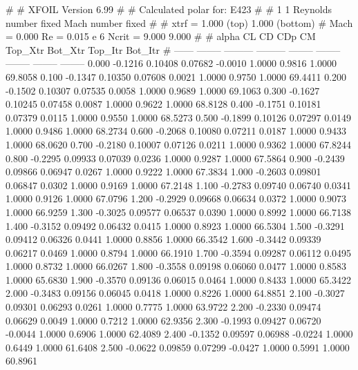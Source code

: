 #  
#       XFOIL         Version 6.99
#  
# Calculated polar for: E423                                            
#  
# 1 1 Reynolds number fixed          Mach number fixed         
#  
# xtrf =   1.000 (top)        1.000 (bottom)  
# Mach =   0.000     Re =     0.015 e 6     Ncrit =   9.000  9.000
#  
#   alpha    CL        CD       CDp       CM     Top_Xtr  Bot_Xtr  Top_Itr  Bot_Itr
#  ------ -------- --------- --------- -------- -------- -------- -------- --------
   0.000  -0.1216   0.10408   0.07682  -0.0010   1.0000   0.9816   1.0000  69.8058
   0.100  -0.1347   0.10350   0.07608   0.0021   1.0000   0.9750   1.0000  69.4411
   0.200  -0.1502   0.10307   0.07535   0.0058   1.0000   0.9689   1.0000  69.1063
   0.300  -0.1627   0.10245   0.07458   0.0087   1.0000   0.9622   1.0000  68.8128
   0.400  -0.1751   0.10181   0.07379   0.0115   1.0000   0.9550   1.0000  68.5273
   0.500  -0.1899   0.10126   0.07297   0.0149   1.0000   0.9486   1.0000  68.2734
   0.600  -0.2068   0.10080   0.07211   0.0187   1.0000   0.9433   1.0000  68.0620
   0.700  -0.2180   0.10007   0.07126   0.0211   1.0000   0.9362   1.0000  67.8244
   0.800  -0.2295   0.09933   0.07039   0.0236   1.0000   0.9287   1.0000  67.5864
   0.900  -0.2439   0.09866   0.06947   0.0267   1.0000   0.9222   1.0000  67.3834
   1.000  -0.2603   0.09801   0.06847   0.0302   1.0000   0.9169   1.0000  67.2148
   1.100  -0.2783   0.09740   0.06740   0.0341   1.0000   0.9126   1.0000  67.0796
   1.200  -0.2929   0.09668   0.06634   0.0372   1.0000   0.9073   1.0000  66.9259
   1.300  -0.3025   0.09577   0.06537   0.0390   1.0000   0.8992   1.0000  66.7138
   1.400  -0.3152   0.09492   0.06432   0.0415   1.0000   0.8923   1.0000  66.5304
   1.500  -0.3291   0.09412   0.06326   0.0441   1.0000   0.8856   1.0000  66.3542
   1.600  -0.3442   0.09339   0.06217   0.0469   1.0000   0.8794   1.0000  66.1910
   1.700  -0.3594   0.09287   0.06112   0.0495   1.0000   0.8732   1.0000  66.0267
   1.800  -0.3558   0.09198   0.06060   0.0477   1.0000   0.8583   1.0000  65.6830
   1.900  -0.3570   0.09136   0.06015   0.0464   1.0000   0.8433   1.0000  65.3422
   2.000  -0.3483   0.09156   0.06045   0.0418   1.0000   0.8226   1.0000  64.8851
   2.100  -0.3027   0.09301   0.06293   0.0261   1.0000   0.7775   1.0000  63.9722
   2.200  -0.2330   0.09474   0.06629   0.0049   1.0000   0.7212   1.0000  62.9356
   2.300  -0.1993   0.09427   0.06720  -0.0044   1.0000   0.6906   1.0000  62.4089
   2.400  -0.1352   0.09597   0.06988  -0.0224   1.0000   0.6449   1.0000  61.6408
   2.500  -0.0622   0.09859   0.07299  -0.0427   1.0000   0.5991   1.0000  60.8961
